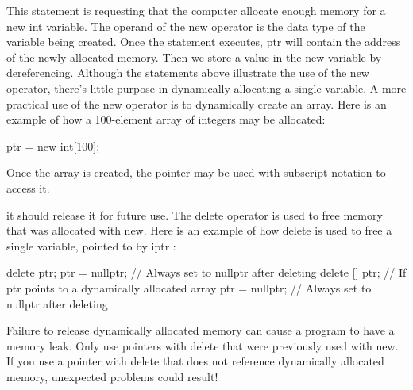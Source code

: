 \documentclass{report}
\begin{document}
    \bigbreak \noindent 
    This statement is requesting that the computer allocate enough memory for a new int variable. The operand of the new operator is the data type of the variable being created. Once the statement executes, ptr will contain the address of the newly allocated memory. Then we store a value in the new variable by dereferencing.
    \bigbreak \noindent 
    Although the statements above illustrate the use of the new operator, there’s little purpose
in dynamically allocating a single variable. A more practical use of the new operator is to
dynamically create an array. Here is an example of how a 100-element array of integers
may be allocated:
\bigbreak \noindent 

\begin{cppcode}
ptr = new int[100];
\end{cppcode}

\bigbreak \noindent 
    Once the array is created, the pointer may be used with subscript notation to access it. 

    \bigbreak \noindent 
     it should
release it for future use. The delete operator is used to free memory that was allocated
with new. Here is an example of how delete is used to free a single variable, pointed to
by iptr :
    \bigbreak \noindent 
    
    \begin{cppcode}
delete ptr;
ptr = nullptr; // Always set to nullptr after deleting
delete [] ptr; // If ptr points to a dynamically allocated array
ptr = nullptr; // Always set to nullptr after deleting
    \end{cppcode}
    
    \bigbreak \noindent 
    \begin{notebox}
			Failure to release dynamically allocated memory can cause a program to have a memory leak. Only use pointers with delete that were previously used with new. If you use a pointer with delete that does not reference dynamically allocated memory, unexpected problems could result!
		\end{notebox}
    \bigbreak \noindent 

    \bigbreak \noindent 
\end{document}
